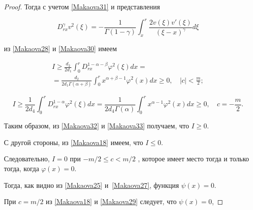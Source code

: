 \begin{proof}
Тогда с учетом  \eqref{Makaova31} и представления

 \[

 D_{rx}^\gamma v^2(\xi)=-\frac{1}{\Gamma(1-\gamma)}

 \int _x^r \frac{2v(\xi)v'(\xi)}{(\xi-x)^\gamma}d\xi

 \]

из \eqref{Makaova28} и \eqref{Makaova30} имеем 

\begin{multline}

\label{Makaova32} 

I \geq 

\frac{d_2}{2d_1}

\int _0^r D_{rx}^{1-\alpha-\beta} \varphi^2(\xi)

dx= \\ =

\frac{d_2}{2d_1\Gamma(\alpha+\beta)}

\int _0^r x^{\alpha+\beta-1} \varphi^2(x)

dx \geq 0, \quad  |c|<\frac{m}{2};

 \end{multline}

 

 \begin{equation}

\label{Makaova33} 

I\geq 

\frac{1}{2d_4}

\int _0^r D_{rx}^{1-\alpha} \varphi^2(\xi)

dx=

\frac{1}{2d_4\Gamma(\alpha)}

\int _0^r x^{\alpha-1} \varphi^2(x)

dx \geq 0, \quad    c=-\frac{m}{2}.

 \end{equation}

Таким образом, из  \eqref{Makaova32} и \eqref{Makaova33} получаем, что $I\geq 0$.

С другой стороны, из  \eqref{Makaova18} имеем, что $I \leq 0$. 

Следовательно, $I=0$ при $-m/2 \leq c < m/2$ , которое имеет место тогда и только тогда, когда $\varphi(x)=0$. 

Тогда, как видно из \eqref{Makaova25} и~\eqref{Makaova27}, функция $\psi(x)=0$.

При $c=m/2$ из   \eqref{Makaova18}  и \eqref{Makaova29} следует, что $\psi(x)=0$,


\end{proof}

